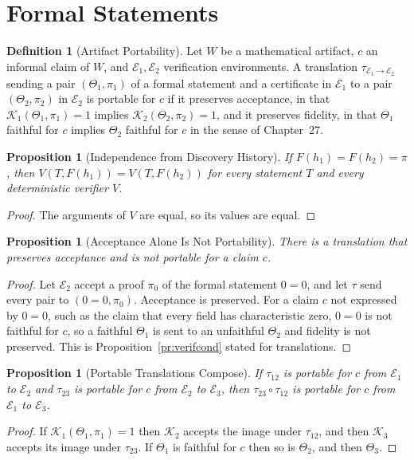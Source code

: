 \documentclass[11pt,letterpaper]{report}
\theoremstyle{plain}
\newtheorem{proposition}[theorem]{Proposition}
\theoremstyle{definition}
\newtheorem{definition}[theorem]{Definition}
\theoremstyle{remark}
\begin{document}
\section{Formal Statements}

\begin{definition}[Artifact Portability]\label{def:portability}
Let $W$ be a mathematical artifact, $c$ an informal claim of $W$, and $\mathcal E_1,\mathcal E_2$ verification environments. A translation $\tau_{\mathcal E_1\to\mathcal E_2}$ sending a pair $(\Theta_1,\pi_1)$ of a formal statement and a certificate in $\mathcal E_1$ to a pair $(\Theta_2,\pi_2)$ in $\mathcal E_2$ is portable for $c$ if it preserves acceptance, in that $\mathcal K_1(\Theta_1,\pi_1)=1$ implies $\mathcal K_2(\Theta_2,\pi_2)=1$, and it preserves fidelity, in that $\Theta_1$ faithful for $c$ implies $\Theta_2$ faithful for $c$ in the sense of Chapter~27.
\end{definition}

\begin{proposition}[Independence from Discovery History]\label{pr:indephistory}
If $F(h_1)=F(h_2)=\pi$, then $V(T,F(h_1))=V(T,F(h_2))$ for every statement $T$ and every deterministic verifier $V$.
\end{proposition}
\begin{proof}
The arguments of $V$ are equal, so its values are equal.
\end{proof}

\begin{proposition}[Acceptance Alone Is Not Portability]\label{pr:acceptnotport}
There is a translation that preserves acceptance and is not portable for a claim $c$.
\end{proposition}
\begin{proof}
Let $\mathcal E_2$ accept a proof $\pi_0$ of the formal statement $0=0$, and let $\tau$ send every pair to $(0=0,\pi_0)$. Acceptance is preserved. For a claim $c$ not expressed by $0=0$, such as the claim that every field has characteristic zero, $0=0$ is not faithful for $c$, so a faithful $\Theta_1$ is sent to an unfaithful $\Theta_2$ and fidelity is not preserved. This is Proposition~\ref{pr:verifcond} stated for translations.
\end{proof}

\begin{proposition}[Portable Translations Compose]\label{pr:portcompose}
If $\tau_{12}$ is portable for $c$ from $\mathcal E_1$ to $\mathcal E_2$ and $\tau_{23}$ is portable for $c$ from $\mathcal E_2$ to $\mathcal E_3$, then $\tau_{23}\circ\tau_{12}$ is portable for $c$ from $\mathcal E_1$ to $\mathcal E_3$.
\end{proposition}
\begin{proof}
If $\mathcal K_1(\Theta_1,\pi_1)=1$ then $\mathcal K_2$ accepts the image under $\tau_{12}$, and then $\mathcal K_3$ accepts its image under $\tau_{23}$. If $\Theta_1$ is faithful for $c$ then so is $\Theta_2$, and then $\Theta_3$.
\end{proof}
\end{document}
